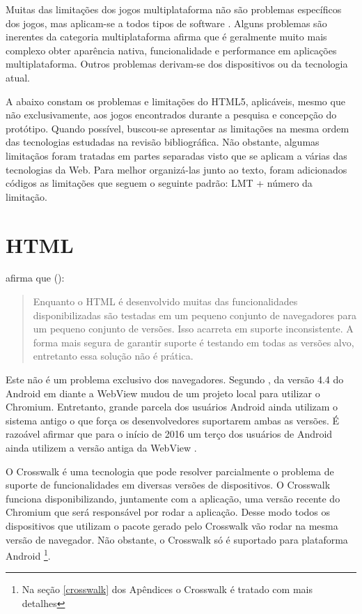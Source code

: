 
Muitas das limitações dos jogos multiplataforma não são
problemas específicos dos jogos, mas aplicam-se a todos tipos
de software \autocite[p. 3]{currentStateCrossPlatform}. Alguns
problemas são inerentes da categoria multiplataforma \citet[p.
7 ]{viabilityBusinessApplications} afirma que é geralmente muito
mais complexo obter aparência nativa, funcionalidade e performance
em aplicações multiplataforma. Outros problemas derivam-se dos
dispositivos ou da tecnologia atual.

A abaixo constam os problemas e limitações do HTML5, aplicáveis,
mesmo que não exclusivamente, aos jogos encontrados durante a pesquisa
e concepção do protótipo. Quando possível, buscou-se apresentar
as limitações na mesma ordem das tecnologias estudadas na revisão
bibliográfica. Não obstante, algumas limitaçãos foram tratadas em
partes separadas visto que se aplicam a várias das tecnologias da
Web. Para melhor organizá-las junto ao texto, foram adicionados
códigos as limitações que seguem o seguinte padrão: LMT + número da
limitação.

\section{HTML}

\noindent\citet{crossPlatformMobileGame} afirma que ():
\begin{quote}
Enquanto o HTML é desenvolvido muitas das funcionalidades
disponibilizadas são testadas em um pequeno conjunto de navegadores
para um pequeno conjunto de versões. Isso acarreta em suporte
inconsistente. A forma mais segura de garantir suporte é testando em
todas as versões alvo, entretanto essa solução não é prática.
\end{quote}

Este não é um problema exclusivo dos navegadores. Segundo
\citet{chromeWebView}, da versão 4.4 do Android em diante a WebView
mudou de um projeto local para utilizar o Chromium. Entretanto, grande
parcela dos usuários Android ainda utilizam o sistema antigo o que
força os desenvolvedores suportarem ambas as versões. É razoável
afirmar que para o início de 2016 um terço dos usuários de Android
ainda utilizem a versão antiga da WebView \autocite{chromeWebView}.

O Crosswalk é uma tecnologia que pode resolver parcialmente o problema
de suporte de funcionalidades em diversas versões de dispositivos.
O Crosswalk funciona disponibilizando, juntamente com a aplicação,
uma versão recente do Chromium que será responsável por rodar a
aplicação. Desse modo todos os dispositivos que utilizam o pacote
gerado pelo Crosswalk vão rodar na mesma versão de navegador. Não
obstante, o Crosswalk só é suportado para plataforma Android \footnote{Na
seção \ref{crosswalk} dos Apêndices o Crosswalk é tratado com mais
detalhes}.

